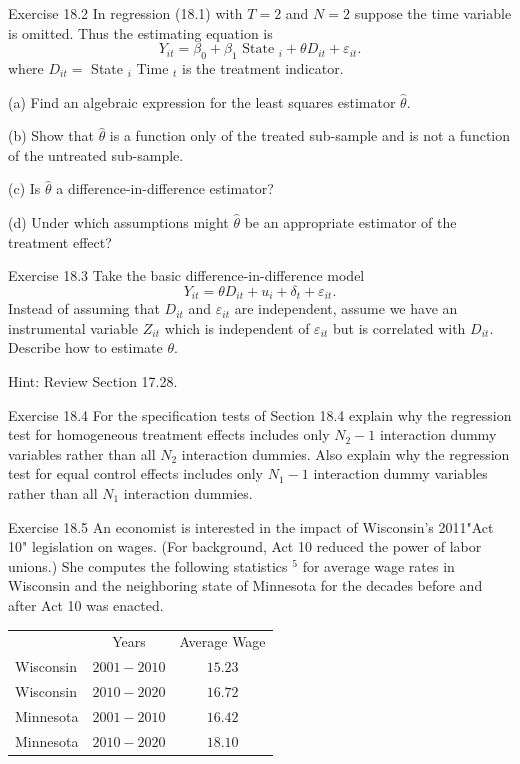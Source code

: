 \documentclass[10pt]{article}
\begin{document}
Exercise 18.2 In regression (18.1) with $T=2$ and $N=2$ suppose the time variable is omitted. Thus the estimating equation is
$$
Y_{i t}=\beta_{0}+\beta_{1} \text { State }_{i}+\theta D_{i t}+\varepsilon_{i t} .
$$
where $D_{i t}=$ State $_{i}$ Time $_{t}$ is the treatment indicator.

(a) Find an algebraic expression for the least squares estimator $\widehat{\theta}$.

(b) Show that $\hat{\theta}$ is a function only of the treated sub-sample and is not a function of the untreated sub-sample.

(c) Is $\hat{\theta}$ a difference-in-difference estimator?

(d) Under which assumptions might $\widehat{\theta}$ be an appropriate estimator of the treatment effect?

Exercise 18.3 Take the basic difference-in-difference model
$$
Y_{i t}=\theta D_{i t}+u_{i}+\delta_{t}+\varepsilon_{i t} .
$$
Instead of assuming that $D_{i t}$ and $\varepsilon_{i t}$ are independent, assume we have an instrumental variable $Z_{i t}$ which is independent of $\varepsilon_{i t}$ but is correlated with $D_{i t}$. Describe how to estimate $\theta$.

Hint: Review Section 17.28.

Exercise 18.4 For the specification tests of Section 18.4 explain why the regression test for homogeneous treatment effects includes only $N_{2}-1$ interaction dummy variables rather than all $N_{2}$ interaction dummies. Also explain why the regression test for equal control effects includes only $N_{1}-1$ interaction dummy variables rather than all $N_{1}$ interaction dummies.

Exercise 18.5 An economist is interested in the impact of Wisconsin's 2011"Act 10" legislation on wages. (For background, Act 10 reduced the power of labor unions.) She computes the following statistics ${ }^{5}$ for average wage rates in Wisconsin and the neighboring state of Minnesota for the decades before and after Act 10 was enacted.

\begin{tabular}{lcc}
\hline\hline
 & Years & Average Wage \\
\cline { 2 - 3 }
Wisconsin & $2001-2010$ & $15.23$ \\
Wisconsin & $2010-2020$ & $16.72$ \\
Minnesota & $2001-2010$ & $16.42$ \\
Minnesota & $2010-2020$ & $18.10$ \\
\hline
\end{tabular}
\end{document}
